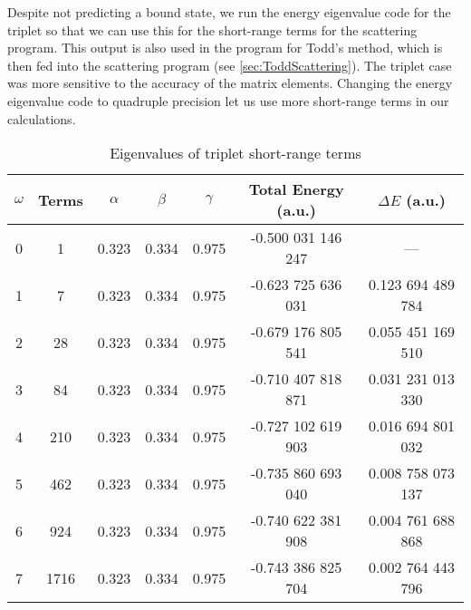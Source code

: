 \documentclass[Dissertation.tex]{subfiles}
\begin{document}
Despite not predicting a bound state, we run the energy eigenvalue code for the 
triplet so that we can use this for the short-range terms for the scattering 
program.
This output is also used in the program for Todd's method, which is then fed 
into the scattering program (see \cref{sec:ToddScattering}). The triplet case 
was more sensitive to the accuracy of the matrix elements.
Changing the energy eigenvalue code to quadruple precision let us use more
short-range terms in our calculations.


\setlength{\abovecaptionskip}{6pt}   %
\setlength{\belowcaptionskip}{6pt}   %
\begin{table}
\centering
\begin{tabular}{c c c c c c c}
\toprule
$\omega$ & Terms & $\alpha$ & $\beta$ & $\gamma$ & Total Energy (a.u.) & $\Delta E$ (a.u.) \\ [0.5ex]
\midrule
0 & 1    & 0.323 & 0.334 & 0.975 & -0.500 031 146 247 & --- \\
1 & 7    & 0.323 & 0.334 & 0.975 & -0.623 725 636 031 & 0.123 694 489 784 \\
2 & 28   & 0.323 & 0.334 & 0.975 & -0.679 176 805 541 & 0.055 451 169 510 \\
3 & 84   & 0.323 & 0.334 & 0.975 & -0.710 407 818 871 & 0.031 231 013 330 \\
4 & 210  & 0.323 & 0.334 & 0.975 & -0.727 102 619 903 & 0.016 694 801 032 \\
5 & 462  & 0.323 & 0.334 & 0.975 & -0.735 860 693 040 & 0.008 758 073 137 \\
6 & 924  & 0.323 & 0.334 & 0.975 & -0.740 622 381 908 & 0.004 761 688 868 \\
7 & 1716 & 0.323 & 0.334 & 0.975 & -0.743 386 825 704 & 0.002 764 443 796 \\
\bottomrule
\end{tabular}
\caption{Eigenvalues of triplet short-range terms}
\label{tab:BoundEnergy3}
\end{table}
\end{document}
